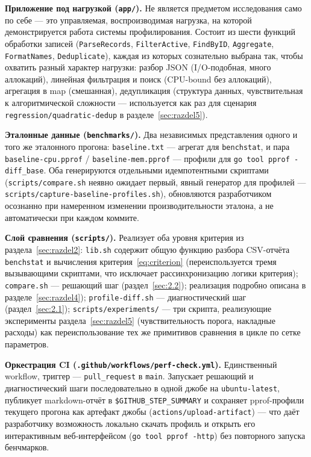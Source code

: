\textbf{Приложение под нагрузкой (\texttt{app/\allowbreak }).} Не является предметом
исследования само по себе — это управляемая, воспроизводимая нагрузка,
на которой демонстрируется работа системы профилирования. Состоит из
шести функций обработки записей (\texttt{ParseRecords}, \texttt{FilterActive},
\texttt{FindByID}, \texttt{Aggregate}, \texttt{FormatNames},
\texttt{Deduplicate}), каждая из которых сознательно выбрана так, чтобы
охватить разный характер нагрузки: разбор JSON (I/O-подобная, много
аллокаций), линейная фильтрация и поиск (CPU-bound без аллокаций),
агрегация в map (смешанная), дедупликация (структура данных,
чувствительная к алгоритмической сложности — используется как раз для
сценария \texttt{regression/\allowbreak quadratic-dedup} в разделе~\ref{sec:razdel5}).

\textbf{Эталонные данные (\texttt{benchmarks/\allowbreak }).} Два независимых
представления одного и того же эталонного прогона: \texttt{baseline.txt} —
агрегат для \texttt{benchstat}, и пара \texttt{baseline-cpu.pprof} /
\texttt{baseline-mem.pprof} — профили для \texttt{go tool pprof
-diff\_base}. Оба генерируются отдельными идемпотентными скриптами
(\texttt{scripts/\allowbreak compare.sh} неявно ожидает первый, явный генератор для
профилей — \texttt{scripts/\allowbreak capture-baseline-profiles.sh}), обновляются
разработчиком осознанно при намеренном изменении производительности
эталона, а не автоматически при каждом коммите.

\textbf{Слой сравнения (\texttt{scripts/\allowbreak }).} Реализует оба уровня
критерия из раздела~\ref{sec:razdel2}: \texttt{lib.sh} содержит общую
функцию разбора CSV-отчёта \texttt{benchstat} и вычисления
критерия~\eqref{eq:criterion} (переиспользуется тремя вызывающими
скриптами, что исключает рассинхронизацию логики критерия);
\texttt{compare.sh} — решающий шаг (раздел~\ref{sec:2.2}); реализация
подробно описана в разделе~\ref{sec:razdel4}); \texttt{profile-diff.sh} —
диагностический шаг (раздел~\ref{sec:2.1}); \texttt{scripts/\allowbreak experiments/\allowbreak }
— три скрипта, реализующие эксперименты раздела~\ref{sec:razdel5}
(чувствительность порога, накладные расходы) как переиспользование тех же
примитивов сравнения в цикле по сетке параметров.

\textbf{Оркестрация CI (\texttt{.github/\allowbreak workflows/\allowbreak perf-check.yml}).}
Единственный workflow, триггер — \texttt{pull\_request} в \texttt{main}.
Запускает решающий и диагностический шаги последовательно в одной джобе на
\texttt{ubuntu-latest}, публикует markdown-отчёт в
\texttt{\$GITHUB\_STEP\_SUMMARY} и сохраняет pprof-профили текущего
прогона как артефакт джобы (\texttt{actions/\allowbreak upload-artifact}) — что даёт
разработчику возможность локально скачать профиль и открыть его
интерактивным веб-интерфейсом (\texttt{go tool pprof -http}) без
повторного запуска бенчмарков.

